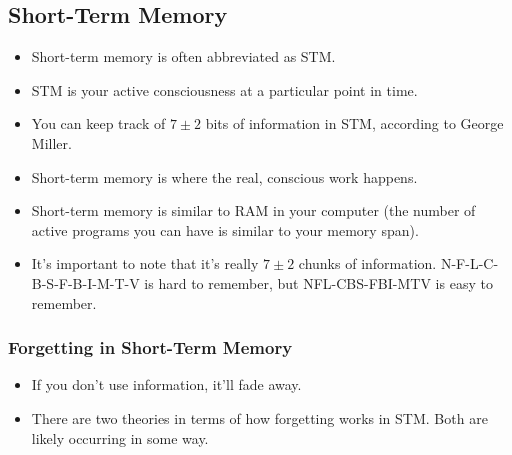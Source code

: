 \documentclass[]{article}
\newcommand{\lecture}[1]{\marginpar{{\footnotesize $\leftarrow$ \underline{#1}}}}
\begin{document}
		\subsection{Short-Term Memory} \lecture{February 5, 2013}
			\begin{itemize}
				\item Short-term memory is often abbreviated as STM.
				\item STM is your active consciousness at a particular point in time.
				\item You can keep track of $7 \pm 2$ bits of information in STM, according to George Miller.
				\item Short-term memory is where the real, conscious work happens.
				\item Short-term memory is similar to RAM in your computer (the number of active programs you can have is similar to your memory span).
				\item It's important to note that it's really $7 \pm 2$ chunks of information. N-F-L-C-B-S-F-B-I-M-T-V is hard to remember, but NFL-CBS-FBI-MTV is easy to remember.
			\end{itemize}

			\subsubsection{Forgetting in Short-Term Memory}
				\begin{itemize}
					\item If you don't use information, it'll fade away.
					\item There are two theories in terms of how forgetting works in STM. Both are likely occurring in some way.
				\end{itemize}
\end{document}
